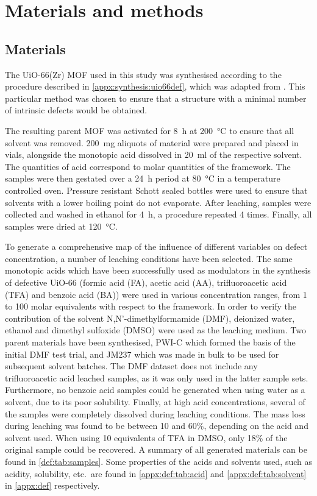 
\section{Materials and methods}

\subsection{Materials}

The UiO-66(Zr) MOF used in this study was synthesised according
to the procedure described in \autoref{appx:synthesis:uio66def},
which was adapted from \citet{shearerTunedPerfectionIroning2014}.
This particular method was chosen to ensure that a structure with
a minimal number of intrinsic defects would be obtained.

The resulting parent MOF was activated for \SI{8}{\hour} at
\SI{200}{\degreeCelsius} to ensure that all solvent was removed.
\SI{200}{\milli\gram} aliquots of material were prepared and 
placed in vials, alongside the monotopic acid dissolved in
\SI{20}{\milli\litre} of the respective solvent. The quantities
of acid correspond to molar quantities of the framework.
The samples were then gestated over a \SI{24}{\hour} period
at \SI{80}{\degreeCelsius} in a temperature controlled oven.
Pressure resistant Schott sealed bottles were used to ensure that
solvents with a lower boiling point do not evaporate.
After leaching, samples were collected and washed in ethanol
for \SI{4}{\hour}, a procedure repeated 4 times. Finally, all 
samples were dried at \SI{120}{\degreeCelsius}.

To generate a comprehensive map of the influence
of different variables on defect concentration, a number of
leaching conditions have been selected. The same monotopic acids 
which have been successfully used
as modulators in the synthesis of defective UiO-66
(formic acid (FA), acetic acid (AA), trifluoroacetic acid (TFA)
and benzoic acid (BA)) were used in various concentration ranges,
from 1 to 100 molar equivalents with respect to the framework.
In order to verify the contribution of the solvent
N,N'-dimethylformamide (DMF), deionized water, ethanol and dimethyl
sulfoxide (DMSO) were used as the leaching medium.
Two parent materials have been synthesised, PWI-C which formed 
the basis of the initial DMF test trial, and JM237 which 
was made in bulk to be used for subsequent solvent batches.
The DMF dataset does not include any trifluoroacetic acid
leached samples, as it was only used in the latter sample sets.
Furthermore, no benzoic acid samples could be generated when using
water as a solvent, due to its poor solubility. Finally, 
at high acid concentrations, several of the samples were completely
dissolved during leaching
conditions. The mass loss during leaching was found to be 
between 10 and 60\%, depending on the acid and solvent used.
When using 10 equivalents of TFA in DMSO, only 18\% of the 
original sample could be recovered. 
A summary of all generated materials can be found in
\autoref{def:tab:samples}.
Some properties of the acids and solvents used, such as acidity,
solubility, etc.\ are found in 
\autoref{appx:def:tab:acid} and \autoref{appx:def:tab:solvent} in 
\autoref{appx:def} respectively.

